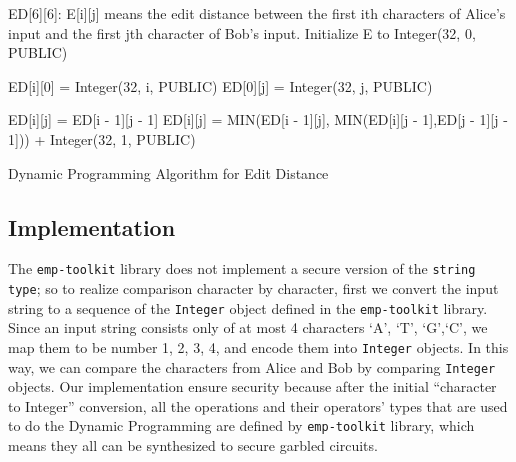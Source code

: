 \begin{algorithm}[h]
    \begin{algorithmic}[1]
        \begin{footnotesize}
        \State ED[6][6]: E[i][j] means the edit distance between the first ith
        characters of Alice's input and the first jth character of Bob's input.
                \State Initialize E to Integer(32, 0, PUBLIC)
            \EndFor

            \State

            \State ED[i][0] = Integer(32, i, PUBLIC)
            \EndFor
            \State ED[0][j] = Integer(32, j, PUBLIC)
            \EndFor

            \State

                        \State ED[i][j] = ED[i - 1][j - 1]
                    \Else
                        \State ED[i][j] = MIN(ED[i - 1][j], MIN(ED[i][j -
                        1],ED[j - 1][j - 1])) + Integer(32, 1, PUBLIC)
                    \EndIf
                \EndFor
            \EndFor
        \EndFunction
        \end{footnotesize}
    \end{algorithmic}
    \caption{Dynamic Programming Algorithm for Edit Distance}
    \label{alg:ed_dp}
\end{algorithm}

\subsection{Implementation}
The {\tt emp-toolkit} library does not implement a secure version of the
{\tt string type}; so to realize comparison character by character, first we
convert the input string to a sequence of the {\tt Integer} object defined
in the {\tt emp-toolkit} library. Since an input string consists only of
at most 4 characters `A', `T', `G',`C', we map them to be number 1, 2, 3, 4,
and encode them into {\tt Integer} objects.
In this way, we can compare the characters from Alice and Bob by comparing
{\tt Integer} objects. Our implementation ensure security because after the
initial ``character to Integer'' conversion, all
the operations and their operators' types that are used to do the
Dynamic Programming are defined by {\tt emp-toolkit} library, which means
they all can be synthesized to secure garbled circuits.

